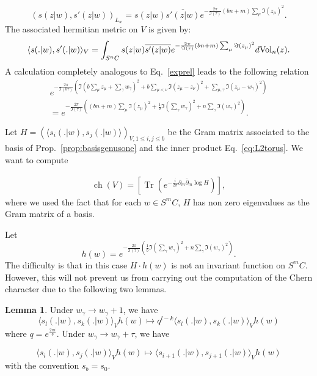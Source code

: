 \documentclass{article}
\theoremstyle{definition}
\newcounter{sharedcounter}[section]
\newtheorem{lemma}[sharedcounter]{Lemma}
\DeclareMathOperator{\ch}{ch}
\DeclareMathOperator{\tr}{Tr}
\newcommand{\ov}[1]{\overline{#1}}
\renewcommand{\leq}{\leqslant}
\begin{document}
$$(s(z|w),s'(z|w) )_{L_w} = s(z|w) \ov{s'(z|w)} e^{-\frac{2\pi}{\Im(\tau)}(bn+m)\sum_\mu \Im(z_\mu)^2}.$$ The associated hermitian metric on $V$ is given by:
\begin{equation}
\label{eq:L2torus}
\langle s(.|w),s'(.|w) \rangle_V = \int_{S^n C} s(z|w) \ov{s'(z|w)} e^{-\frac{2\pi}{\Im(\tau)}(bn+m)\sum_\mu \Im(z_\mu)^2} d{\rm Vol}_n(z).
\end{equation}
A calculation completely analogous to Eq.\ \eqref{exprel} leads to the following relation
\begin{align*}
e^{-\frac{2\pi}{\Im(b\tau)} \left(\Im(b\sum_\mu z_\mu+\sum_\gamma w_\gamma)^2+b\sum_{\mu<\nu}\Im(z_\mu-z_\nu)^2 +\sum_{\mu,\gamma} \Im(z_\mu-w_\gamma)^2\right)}\\=e^{-\frac{2\pi}{\Im(\tau)} \left((bn+m) \sum_\mu \Im(z_\mu)^2 + \frac{1}{b} \Im(\sum_\gamma w_\gamma)^2 + n\sum_\gamma \Im(w_\gamma)^2 \right)}.
\end{align*}




Let $H=(\langle s_i(.|w),s_j(.|w)\rangle)_{V,1\leq i,j\leq b}$ be the Gram matrix associated to the basis of Prop.\ \ref{prop:basisgenusone} and the inner product Eq.\ \eqref{eq:L2torus}. We want to compute

\begin{align}
    \ch(V)=\left[\tr  \left( e^{- \frac{i}{2\pi}\partial_m \ov{\partial}_m \log H}\right)\right],
\end{align} where we used the fact that for each $w \in S^m C$, $H$ has non zero eigenvalues as the Gram matrix of a basis.


Let $$h(w)=e^{-\frac{2\pi}{\Im(\tau)} \left(\frac{1}{b} \Im(\sum_\gamma w_\gamma)^2 + n\sum_\gamma \Im(w_\gamma)^2 \right)}.$$
The difficulty is that in this case $H\cdot h(w)$ is not an invariant function on $S^mC$. However, this will not prevent us from carrying out the computation of the Chern character due to the following two lemmas. 

\begin{lemma}
Under $w_\gamma \to w_\gamma+1$, we have 
\begin{equation}
   \langle s_l(.|w),s_k(.|w) \rangle_V h(w) \mapsto q^{l-k}\langle s_{l}(.|w),s_{k}(.|w) \rangle_V h(w)
  \end{equation}
  where $q=e^{\frac{2\pi i}{b}}$.
Under $w_\gamma \to w_\gamma+\tau$, we have 
 
\begin{equation}
  \langle s_i(.|w),s_j(.|w) \rangle_V h(w) \mapsto \langle s_{i+1}(.|w),s_{j+1}(.|w) \rangle_V h(w) 
   \end{equation} with the convention $s_b=s_0$.
\end{lemma}
\end{document}
